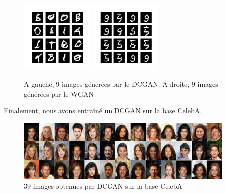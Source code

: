 \begin{figure}[!h]
\centering
\includegraphics[width=100pt]{"images/GAN/MNIST_DCGAN"}
\includegraphics[width=100pt]{"images/GAN/MNIST_WGAN"}
\caption{A gauche, 9 images générées par le DCGAN. A droite, 9 images générées par le WGAN}
\label{mnist_gan}
\end{figure}

Finalement, nous avons entraîné un DCGAN sur la base CelebA.

\begin{figure}[!h]
\centering
\includegraphics[width=300pt]{"images/GAN/DCGAN"}
\caption{39 images obtenues par DCGAN sur la base CelebA}
\label{celeb_gan}
\end{figure}